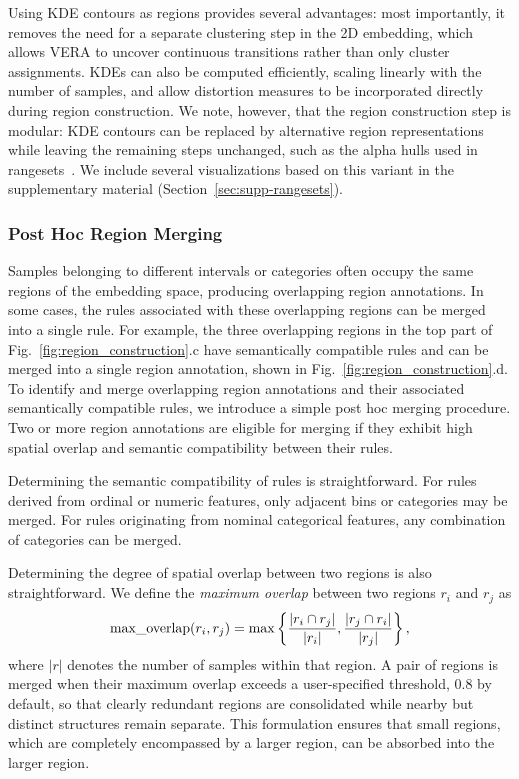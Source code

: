 \documentclass[lettersize,journal]{IEEEtran}
\begin{document}
Using KDE contours as regions provides several advantages: most importantly, it removes the need for a separate clustering step in the 2D embedding, which allows VERA to uncover continuous transitions rather than only cluster assignments. KDEs can also be computed efficiently, scaling linearly with the number of samples, and allow distortion measures to be incorporated directly during region construction.
We note, however, that the region construction step is modular: KDE contours can be replaced by alternative region representations while leaving the remaining steps unchanged, such as the alpha hulls used in rangesets~\cite{Sohns2022}. We include several visualizations based on this variant in the supplementary material (Section~\ref{sec:supp-rangesets}).

\subsubsection{Post Hoc Region Merging}
\label{sec:post-hoc-merge}

Samples belonging to different intervals or categories often occupy the same regions of the embedding space, producing overlapping region annotations.
In some cases, the rules associated with these overlapping regions can be merged into a single rule.
For example, the three overlapping regions in the top part of Fig.~\ref{fig:region_construction}.c have semantically compatible rules and can be merged into a single region annotation, shown in Fig.~\ref{fig:region_construction}.d.
To identify and merge overlapping region annotations and their associated semantically compatible rules, we introduce a simple post hoc merging procedure.
Two or more region annotations are eligible for merging if they exhibit high spatial overlap and semantic compatibility between their rules.

Determining the semantic compatibility of rules is straightforward. For rules derived from ordinal or numeric features, only adjacent bins or categories may be merged. For rules originating from nominal categorical features, any combination of categories can be merged.

Determining the degree of spatial overlap between two regions is also straightforward.
We define the \textit{maximum overlap} between two regions $r_i$ and $r_j$ as
\begin{equation}
\text{max\_overlap}(r_i, r_j) = \max \left \{ \frac{|r_i \cap r_j|}{|r_i|}, \frac{|r_j \cap r_i|}{|r_j|} \right \}, \notag
\end{equation}
where $|r|$ denotes the number of samples within that region.
A pair of regions is merged when their maximum overlap exceeds a user-specified threshold, $0.8$ by default, so that clearly redundant regions are consolidated while nearby but distinct structures remain separate.
This formulation ensures that small regions, which are completely encompassed by a larger region, can be absorbed into the larger region.
\end{document}
